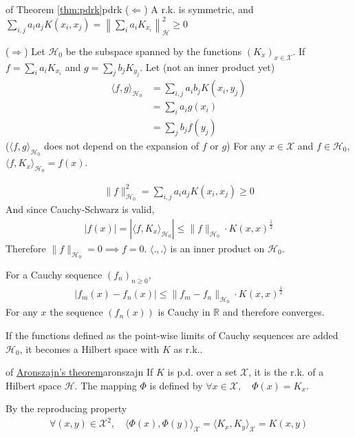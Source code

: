\documentclass[10pt]{article}
\begin{document}
\begin{Proof}{of Theorem \ref{thm:pdrk}}{pdrk}
  ($\Leftarrow$) A r.k. is symmetric, and $\sum_{i,j} a_i a_j K(x_i, x_j)
   = \left\lVert \sum_i a_i K_{x_i} \right\rVert^2_\mathcal{H} \geq 0$

  \vspace{10pt}
  ($\Rightarrow$) Let $\mathcal{H}_0$ be the subspace spanned by the functions 
  $(K_x)_{x\in \mathcal{X}}$. If $f = \sum_i a_i K_{x_i}$ and $g =
  \sum_j b_j K_{y_j}$. Let (not an inner product yet)
  \begin{align*}
    \langle f, g\rangle_{\mathcal{H}_0} &= \sum_{i,j}a_i b_j K(x_i, y_j)\\
    &= \sum_i a_i g(x_i)\\
    &= \sum_j b_j f(y_j)
  \end{align*}
  ($\langle f,g \rangle_{\mathcal{H}_0}$ does not depend on the expansion of $f$
  or $g$) For any $x\in \mathcal{X}$ and $f \in \mathcal{H}_0$, $\langle f,K_x 
  \rangle_{\mathcal{H}_0} = f(x)$.

  \begin{align*}
    \lVert f \rVert^2_{\mathcal{H}_0} = \sum_{i,j} a_i a_j K(x_i, x_j) \geq 0
  \end{align*}
  And since Cauchy-Schwarz is valid, 
  \begin{align*}
    |f(x)| = |\langle f, K_x \rangle_{\mathcal{H}_0}| \leq \lVert f 
    \rVert_{\mathcal{H}_0}\cdot K(x,x)^{\frac{1}{2}}
  \end{align*}
  Therefore $\lVert f \rVert_{\mathcal{H}_0} = 0 \implies f = 0$. $\langle ., .
  \rangle$ is an inner product on $\mathcal{H}_0$. 

  For a Cauchy sequence $(f_n)_{n\geq 0}$, 
  \begin{align*}
    |f_m(x) - f_n(x)| \leq \lVert f_m - f_n \rVert_{\mathcal{H}_0} \cdot
    K(x, x)^{\frac{1}{2}}
  \end{align*}
  For any $x$ the sequence $(f_n(x))$ is Cauchy in $\mathbb{R}$ and therefore
  converges. 

  If the functions defined as the point-wise limits of Cauchy sequences are
  added $\mathcal{H}_0$, it becomes a Hilbert space with $K$ as r.k..
\end{Proof}

\begin{Proof}{of \hyperref[thm:aronszajn]{Aronszajn's theorem}}{aronszajn}
  If $K$ is p.d. over a set $\mathcal{X}$, it is the r.k. of a Hilbert space 
  $\mathcal{H}$. The mapping $\Phi$ is defined by $\forall x \in \mathcal{X}, 
  \quad \Phi(x) = K_x$.

  By the reproducing property 
  \begin{align*}
    \forall (x,y)\in \mathcal{X}^2,\quad \langle \Phi(x), \Phi(y) 
    \rangle_\mathcal{X} = \langle K_x, K_y \rangle_\mathcal{X} = K(x, y)
  \end{align*}
\end{Proof}
\end{document}
